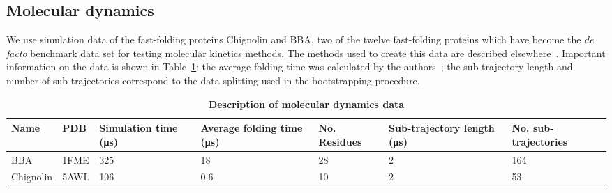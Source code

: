 \documentclass[journal=jacsat,manuscript=article]{achemso}
\begin{document}
\subsection{Molecular dynamics}

We use simulation data of the fast-folding proteins Chignolin and BBA, two of the twelve fast-folding proteins which have become the \textit{de facto} benchmark data set for testing molecular kinetics methods. The methods used to create this data are described elsewhere~\cite{lindorff-larsen_how_2011}. Important information on the data is shown in Table~\ref{tab:data_description}: the average folding time was calculated by the authors~\cite{lindorff-larsen_how_2011}; the sub-trajectory length and number of sub-trajectories correspond to the data splitting used in the bootstrapping procedure. 

\begin{table}
    \caption{\textbf{Description of molecular dynamics data}}
    \begin{tabularx}{\textwidth}{llXXXXX}
    \toprule
    Name & PDB & Simulation time (\si{\micro\second}) & Average folding time (\si{\micro\second}) & No. Residues & Sub-trajectory length (\si{\micro\second}) & No. sub-trajectories \\
    \midrule
    BBA                 & 1FME      & \num{325}     & \num{18}  & 28 & \num{2} & 164 \\
    Chignolin           & 5AWL    & \num{106}     & \num{0.6}  & 10 & 2 & 53 \\ 
    \bottomrule
    \end{tabularx}
    \label{tab:data_description}
\end{table}
\end{document}
